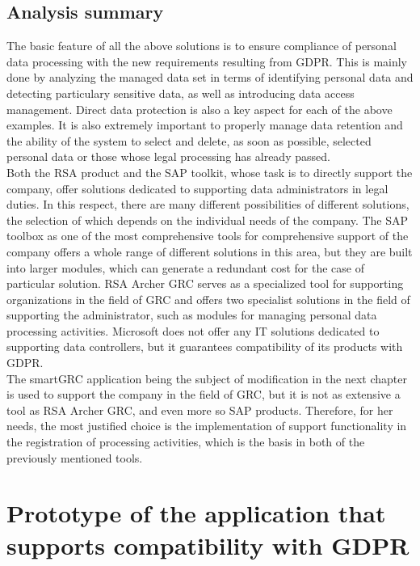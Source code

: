 \documentclass[en, noamssymb]{mgr}
\begin{document}
\section{Analysis summary}

The basic feature of all the above solutions is to ensure compliance of personal data processing with the new requirements resulting from GDPR. This is mainly done by analyzing the managed data set in terms of identifying personal data and detecting particulary sensitive data, as well as introducing data access management. Direct data protection is also a key aspect for each of the above examples. It is also extremely important to properly manage data retention and the ability of the system to select and delete, as soon as possible, selected personal data or those whose legal processing has already passed.\\
\indent Both the RSA product and the SAP toolkit, whose task is to directly support the company, offer solutions dedicated to supporting data administrators in legal duties. In this respect, there are many different possibilities of different solutions, the selection of which depends on the individual needs of the company. The SAP toolbox as one of the most comprehensive tools for comprehensive support of the company offers a whole range of different solutions in this area, but they are built into larger modules, which can generate a redundant cost for the case of particular solution. RSA Archer GRC serves as a specialized tool for supporting organizations in the field of GRC and offers two specialist solutions in the field of supporting the administrator, such as modules for managing personal data processing activities. Microsoft does not offer any IT solutions dedicated to supporting data controllers, but it guarantees compatibility of its products with GDPR.\\
\indent The smartGRC application being the subject of modification in the next chapter is used to support the company in the field of GRC, but it is not as extensive a tool as RSA Archer GRC, and even more so SAP products. Therefore, for her needs, the most justified choice is the implementation of support functionality in the registration of processing activities, which is the basis in both of the previously mentioned tools.

\chapter{Prototype of the application that supports compatibility with GDPR}\label{sec:sekcjaOpisPrototypu}
\end{document}

